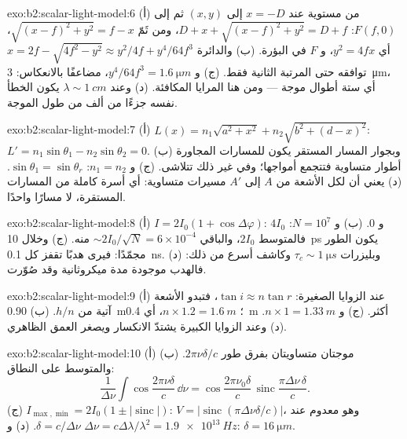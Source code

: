 \begin{solution}{exo:b2:scalar-light-model:6}
(أ) من  مستوية عند $x = -D$ إلى $(x, y)$ ثم إلى $F(f, 0)$: $D + x
+ \sqrt{(x - f)^2 + y^2} = D + f$، ومن ثَمّ $\sqrt{(x - f)^2 + y^2} = f - x$، أي $y^2 = 4fx$،
و $F$ في البؤرة. (ب) والدائرة $x = 2f - \sqrt{4f^2 - y^2} \approx y^2/4f +
y^4/64f^3$ توافقه حتى المرتبة الثانية فقط. (ج) و $y^4/64f^3 = \qty{1.6}{\micro m}$، مضاعفًا
بالانعكاس: \qty{3}{\micro m}، أي ستة أطوال موجة --- ومن هنا المرايا
المكافئة. (د) وعند $\lambda \sim \qty{1}{cm}$ يكون الخطأ نفسه جزءًا من ألف من
طول الموجة.
\end{solution}

\begin{solution}{exo:b2:scalar-light-model:7}
(أ) $L(x) = n_1\sqrt{a^2 + x^2} + n_2\sqrt{b^2 + (d - x)^2}$: $L' = n_1\sin\theta_1 -
n_2\sin\theta_2 = 0$. (ب) وبجوار المسار المستقر يكون للمسارات المجاورة
أطوار متساوية فتتجمع أمواجها؛ وفي غير ذلك تتلاشى. (ج) و $n_1 = n_2$:
$\sin\theta_1 = \sin\theta_r$. (د)  يعني أن لكل الأشعة من $A$ إلى $A'$
مسيرات متساوية: أي أسرة كاملة من المسارات المستقرة، لا مسارًا واحدًا.
\end{solution}

\begin{solution}{exo:b2:scalar-light-model:8}
(أ) $I = 2I_0(1 + \cos\Delta\varphi)$: $4I_0$ و $0$. (ب) و $N = 10^7$: فالمتوسط $2I_0$، والباقي
$\sim 2I_0/\sqrt N = 6 \times 10^{-4}$ منه. (ج) وخلال \qty{10}{ps} يكون الطور
مجمّدًا: فيرى هدبًا تقفز كل \qty{0.1}{ns}. (د) وبليزرات
$\tau_c \sim \qty{1}{\micro s}$ وكاشف أسرع من ذلك: فالهدب موجودة
مدة ميكروثانية وقد صُوّرت.
\end{solution}

\begin{solution}{exo:b2:scalar-light-model:9}
(أ) عند الزوايا الصغيرة: $\tan i \approx n\tan r$، فتبدو الأشعة آتية من $h/n$.
(ب) \qty{0.90}{m}؛  $n \times 1.2 = \qty{1.6}{m}$، أي \qty{0.4}{m} أكثر.
(ج) و $n \times 1 = \qty{1.33}{m}$. (د) وعند الزوايا الكبيرة يشتدّ الانكسار
ويصغر العمق الظاهري.
\end{solution}

\begin{solution}{exo:b2:scalar-light-model:10}
(أ) موجتان متساويتان بفرق طور $2\pi\nu\delta/c$. (ب) والمتوسط
على النطاق:
\[
\frac1{\Delta\nu}\int\cos\frac{2\pi\nu\delta}c\,\dd\nu = \cos\frac{2\pi\nu_0\delta}c\,\operatorname{sinc}\frac{\pi\Delta\nu\,\delta}c .
\]
(ج)
$I_{\max, \min} = 2I_0(1 \pm |\operatorname{sinc}|)$: $V = |\operatorname{sinc}(\pi\Delta\nu\delta/c)|$،
وهو معدوم عند $\delta = c/\Delta\nu$. (د) و $\Delta\nu = c\Delta\lambda/\lambda^2 = \qty{1.9e13}{Hz}$: $\delta =
\qty{16}{\micro m}$.
\end{solution}

